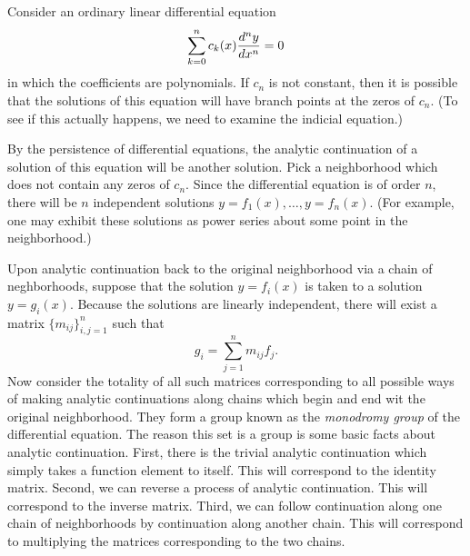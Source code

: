 \documentclass[12pt]{article}
\begin{document}
Consider an ordinary linear differential equation 
 \[\sum_{k = 0}^n c_k (x) {d^n y \over dx^n} = 0\]
in which the coefficients are polynomials.  If $c_n$ 
is not constant, then it is possible that the solutions
of this equation will have branch points at the zeros
of $c_n$.  (To see if this actually happens, we need to
examine the indicial equation.)

By the persistence of differential equations, the analytic
continuation of a solution of this equation will be another
solution.  Pick a neighborhood which does not contain any
zeros of $c_n$.  Since the differential equation is of order 
$n$, there will be $n$ independent solutions $y = f_1 (x),
\ldots, y = f_n (x)$.  (For example, one may exhibit these
solutions as power series about some point in the neighborhood.)

Upon analytic continuation back to the original neighborhood via 
a chain of neghborhoods, suppose 
that the solution $y = f_i (x)$ is taken to a solution $y = {g}_i (x)$.
Because the solutions are linearly independent, there will exist a matrix 
$\{m_{ij}\}_{i,j=1}^n$ such that
 \[ {g}_i = \sum_{j=1}^n m_{ij} f_j. \]
Now consider the totality of all such matrices corresponding to
all possible ways of making analytic continuations along chains
which begin and end wit the original neighborhood.  They form a
group known as the \emph{monodromy group} of the differential 
equation.  The reason this set is a group is some basic facts
about analytic continuation.  First, there is the trivial analytic
continuation which simply takes a function element to itself.  This 
will correspond to the identity matrix.  Second, we can reverse a
process of analytic continuation.  This will correspond to the inverse
matrix.  Third, we can follow continuation along one chain of 
neighborhoods by continuation along another chain.  This will 
correspond to multiplying the matrices corresponding to the two chains.


\end{document}
